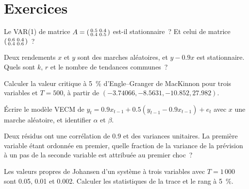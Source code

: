 \section{Exercices}

\begin{exercise}[$\star$]\label{exo:qm:multivariate-series-and-cointegration:1}
Le VAR(1) de matrice $A = \begin{psmallmatrix}0.5 & 0.4\\ 0.4 & 0.5\end{psmallmatrix}$ est-il stationnaire~? Et celui de matrice $\begin{psmallmatrix}0.6 & 0.4\\ 0.4 & 0.6\end{psmallmatrix}$~?
\end{exercise}

\begin{exercise}[$\star$]\label{exo:qm:multivariate-series-and-cointegration:2}
Deux rendements $x$ et $y$ sont des marches aléatoires, et $y - 0.9x$ est stationnaire. Quels sont $k$, $r$ et le nombre de tendances communes~?
\end{exercise}

\begin{exercise}[$\star$]\label{exo:qm:multivariate-series-and-cointegration:3}
Calculer la valeur critique à 5~\% d'Engle--Granger de MacKinnon pour trois variables et $T = 500$, à partir de $(-3.74066, -8.5631, -10.852, 27.982)$.
\end{exercise}

\begin{exercise}[$\star\star$]\label{exo:qm:multivariate-series-and-cointegration:4}
Écrire le modèle VECM de $y_t = 0.9x_{t-1} + 0.5(y_{t-1} - 0.9x_{t-1}) + e_t$ avec $x$ une marche aléatoire, et identifier $\alpha$ et $\beta$.
\end{exercise}

\begin{exercise}[$\star\star$]\label{exo:qm:multivariate-series-and-cointegration:5}
Deux résidus ont une corrélation de 0.9 et des variances unitaires. La première variable étant ordonnée en premier, quelle fraction de la variance de la prévision à un pas de la seconde variable est
attribuée au premier choc~?
\end{exercise}

\begin{exercise}[$\star\star$]\label{exo:qm:multivariate-series-and-cointegration:6}
Les valeurs propres de Johansen d'un système à trois variables avec $T = 1\,000$ sont 0.05, 0.01 et 0.002. Calculer les statistiques de la trace et le rang à 5~\%.
\end{exercise}

